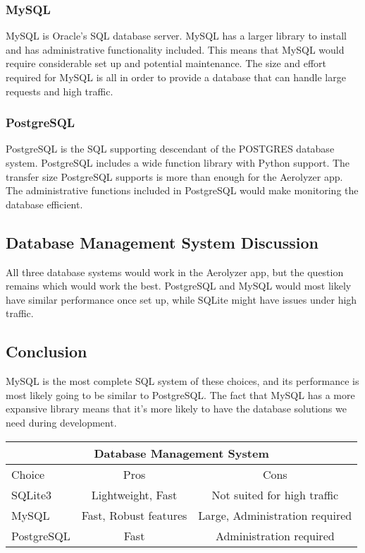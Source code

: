 \documentclass[onecolumn, draftclsnofoot,10pt, compsoc]{IEEEtran}
\begin{document}
\begin{singlespace}
\subsubsection{MySQL}
MySQL is Oracle's SQL database server.
MySQL has a larger library to install and has administrative functionality included.
This means that MySQL would require considerable set up and potential maintenance.
The size and effort required for MySQL is all in order to provide a database that can handle large requests and high traffic.\cite{MySQLDoc}
\subsubsection{PostgreSQL}
PostgreSQL is the SQL supporting descendant of the POSTGRES database system.
PostgreSQL includes a wide function library with Python support.
The transfer size PostgreSQL supports is more than enough for the Aerolyzer app.
The administrative functions included in PostgreSQL would make monitoring the database efficient.\cite{PostgreSQLDoc}
\subsection{Database Management System Discussion}
All three database systems would work in the Aerolyzer app, but the question remains which would work the best. PostgreSQL and MySQL would most likely have similar performance once set up, while SQLite might have issues under high traffic.
\subsection{Conclusion}
MySQL is the most complete SQL system of these choices, and its performance is most likely going to be similar to PostgreSQL.
The fact that MySQL has a more expansive library means that it's more likely to have the database solutions we need during development.
\begin{center}
	\begin{tabular}{|l|c|c|} 
		\hline
		\multicolumn{3}{|c|}{Database Management System} \\
		\hline
		Choice & Pros & Cons\\ [0.5ex] 
		\hline\hline
		SQLite3 & Lightweight, Fast & Not suited for high traffic \\ 
		\hline
		MySQL & Fast, Robust features & Large, Administration required \\
		\hline
		PostgreSQL & Fast & Administration required\\ [1ex] 
		\hline
	\end{tabular}
\end{center}



\end{singlespace}
\end{document}
